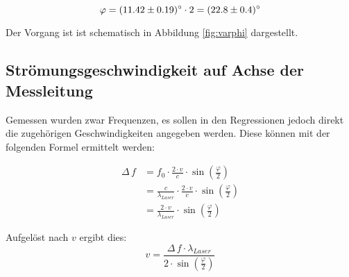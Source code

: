 \begin{equation}
    \label{eq:varphi_result}
    \varphi = \SI{11.42 \pm 0.19}{\degree} \cdot 2 = \SI{22.8 \pm 0.4}{\degree}
\end{equation}

Der Vorgang ist ist schematisch in Abbildung \ref{fig:varphi} dargestellt.

\begin{minipage}[t]{\textwidth}
    \centering
    \resizebox{.67\textwidth}{!}{}
    \label{fig:varphi}
\end{minipage}


\subsection{Str\"omungsgeschwindigkeit auf Achse der Messleitung}
\label{subsec:achse}

Gemessen wurden zwar Frequenzen, es sollen in den Regressionen jedoch direkt die
zugeh\"origen Geschwindigkeiten angegeben werden. Diese k\"onnen mit der folgenden
Formel ermittelt werden:

\begin{equation}
    \begin{split}
        \label{eq:deltaF2}
        \Delta\,f &= f_0 \cdot \frac{2 \cdot v}{c} \cdot \sin\left( \frac{\varphi}{2}\right) \\
                  &= \frac{c}{\lambda_{Laser}} \cdot \frac{2 \cdot v}{c} \cdot \sin\left( \frac{\varphi}{2}\right)\\
                  &= \frac{2 \cdot v}{\lambda_{Laser}} \cdot \sin\left( \frac{\varphi}{2}\right)
    \end{split}
\end{equation}

Aufgel\"ost nach $v$ ergibt dies:
\begin{equation}
    \label{eq:vFromf}
    v = \frac{\Delta\,f \cdot \lambda_{Laser}}{2 \cdot \sin\left(\frac{\varphi}{2}\right)}
\end{equation}


